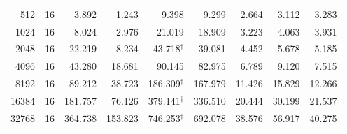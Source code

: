 \begin{table}[!t]
\begin{tabular}{|r|r|r|r|r|r|r|r|r|}
512 & 16 & 3.892 & 1.243 & 9.398 & 9.299 & 2.664 & 3.112 & 3.283 \\
1024 & 16 & 8.024 & 2.976 & 21.019 & 18.909 & 3.223 & 4.063 & 3.931 \\
2048 & 16 & 22.219 & 8.234 & 43.718$^{\dagger}$ & 39.081 & 4.452 & 5.678 & 5.185 \\
4096 & 16 & 43.280 & 18.681 & 90.145 & 82.975 & 6.789 & 9.120 & 7.515 \\
8192 & 16 & 89.212 & 38.723 & 186.309$^{\dagger}$ & 167.979 & 11.426 & 15.829 & 12.266 \\
16384 & 16 & 181.757 & 76.126 & 379.141$^{\dagger}$ & 336.510 & 20.444 & 30.199 & 21.537 \\
32768 & 16 & 364.738 & 153.823 & 746.253$^{\dagger}$ & 692.078 & 38.576 & 56.917 & 40.275 \\
\hline\end{tabular}\end{table}

